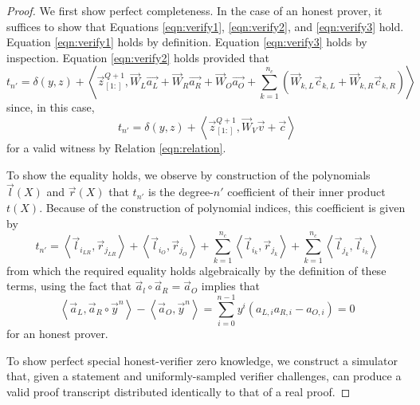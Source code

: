 \documentclass{article}
\newcommand{\mat}[1]{\vec{#1}}
\newcommand{\zq}{\vec{z}^{Q+1}_{[1:]}}
\begin{document}
\begin{proof}
	We first show perfect completeness.
	In the case of an honest prover, it suffices to show that Equations \ref{eqn:verify1}, \ref{eqn:verify2}, and \ref{eqn:verify3} hold.
	Equation \ref{eqn:verify1} holds by definition.
	Equation \ref{eqn:verify3} holds by inspection.
	Equation \ref{eqn:verify2} holds provided that
	$$t_{n'} = \delta(y, z) + \left\langle \zq, \mat{W}_L \vec{a_L} + \mat{W}_R \vec{a_R} + \mat{W}_O \vec{a_O} + \sum_{k=1}^{n_c} \left( \mat{W}_{k,L} \vec{c}_{k,L} + \mat{W}_{k,R} \vec{c}_{k,R} \right) \right\rangle$$
	since, in this case,
	$$t_{n'} = \delta(y, z) + \left\langle \zq, \mat{W}_V \vec{v} + \vec{c} \right\rangle$$
	for a valid witness by Relation \ref{eqn:relation}.

	To show the equality holds, we observe by construction of the polynomials $\vec{l}(X)$ and $\vec{r}(X)$ that $t_{n'}$ is the degree-$n'$ coefficient of their inner product $t(X)$.
	Because of the construction of polynomial indices, this coefficient is given by
	$$t_{n'} = \left\langle \vec{l}_{i_{LR}}, \vec{r}_{j_{LR}} \right\rangle
	+ \left\langle \vec{l}_{i_O}, \vec{r}_{j_O} \right\rangle
	+ \sum_{k=1}^{n_c} \left\langle \vec{l}_{i_k}, \vec{r}_{j_k} \right\rangle + \sum_{k=1}^{n_c} \left\langle \vec{l}_{j_k}, \vec{l}_{i_k} \right\rangle$$
	from which the required equality holds algebraically by the definition of these terms, using the fact that $\vec{a}_l \circ \vec{a}_R = \vec{a}_O$ implies that
	$$\left\langle \vec{a}_L, \vec{a}_R \circ \vec{y}^n \right\rangle - \left\langle \vec{a}_O, \vec{y}^n \right\rangle = \sum_{i=0}^{n-1} y^i \left( a_{L,i} a_{R,i} - a_{O,i} \right) = 0$$
	for an honest prover.

	To show perfect special honest-verifier zero knowledge, we construct a simulator that, given a statement and uniformly-sampled verifier challenges, can produce a valid proof transcript distributed identically to that of a real proof.


\end{proof}
\end{document}
